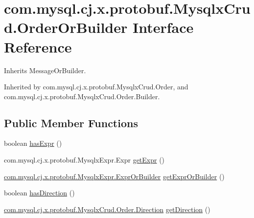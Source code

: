 \hypertarget{interfacecom_1_1mysql_1_1cj_1_1x_1_1protobuf_1_1_mysqlx_crud_1_1_order_or_builder}{}\section{com.\+mysql.\+cj.\+x.\+protobuf.\+Mysqlx\+Crud.\+Order\+Or\+Builder Interface Reference}
\label{interfacecom_1_1mysql_1_1cj_1_1x_1_1protobuf_1_1_mysqlx_crud_1_1_order_or_builder}


Inherits Message\+Or\+Builder.



Inherited by com.\+mysql.\+cj.\+x.\+protobuf.\+Mysqlx\+Crud.\+Order, and com.\+mysql.\+cj.\+x.\+protobuf.\+Mysqlx\+Crud.\+Order.\+Builder.

\subsection*{Public Member Functions}
\begin{DoxyCompactItemize}
\item 
boolean \mbox{\hyperlink{interfacecom_1_1mysql_1_1cj_1_1x_1_1protobuf_1_1_mysqlx_crud_1_1_order_or_builder_a2b5f18b18a73c655dac716f4d5c0efd7}{has\+Expr}} ()
\item 
com.\+mysql.\+cj.\+x.\+protobuf.\+Mysqlx\+Expr.\+Expr \mbox{\hyperlink{interfacecom_1_1mysql_1_1cj_1_1x_1_1protobuf_1_1_mysqlx_crud_1_1_order_or_builder_aaba7689ac937be8bee5816b61262f205}{get\+Expr}} ()
\item 
\mbox{\hyperlink{interfacecom_1_1mysql_1_1cj_1_1x_1_1protobuf_1_1_mysqlx_expr_1_1_expr_or_builder}{com.\+mysql.\+cj.\+x.\+protobuf.\+Mysqlx\+Expr.\+Expr\+Or\+Builder}} \mbox{\hyperlink{interfacecom_1_1mysql_1_1cj_1_1x_1_1protobuf_1_1_mysqlx_crud_1_1_order_or_builder_a8a4069c592e32c28e44d606a4a72ff4f}{get\+Expr\+Or\+Builder}} ()
\item 
boolean \mbox{\hyperlink{interfacecom_1_1mysql_1_1cj_1_1x_1_1protobuf_1_1_mysqlx_crud_1_1_order_or_builder_a4f02b4b2c0a944f9ee695c5436bf255c}{has\+Direction}} ()
\item 
\mbox{\hyperlink{enumcom_1_1mysql_1_1cj_1_1x_1_1protobuf_1_1_mysqlx_crud_1_1_order_1_1_direction}{com.\+mysql.\+cj.\+x.\+protobuf.\+Mysqlx\+Crud.\+Order.\+Direction}} \mbox{\hyperlink{interfacecom_1_1mysql_1_1cj_1_1x_1_1protobuf_1_1_mysqlx_crud_1_1_order_or_builder_aa7274e7e3372a9bb14aaca213b9976a3}{get\+Direction}} ()
\end{DoxyCompactItemize}


